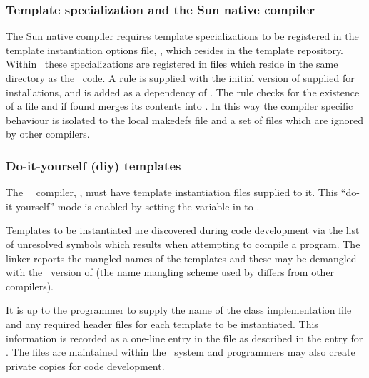 \subsubsection*{Template specialization and the Sun native compiler}

The Sun native compiler requires template specializations to be registered in
the template instantiation options file, , which resides in
the template repository.  Within \aipspp\ these specializations are registered
in  files which reside in the same directory as the
\cplusplus\ code.  A  rule is supplied with the initial
version of  supplied for  installations, and
 is added as a dependency of .  The
 rule checks for the existence of a 
file and if found merges its contents into .  In this way
the compiler specific behaviour is isolated to the local makedefs file and a
set of  files which are ignored by other compilers.

\subsubsection*{Do-it-yourself (diy) templates}

The \gnu\ \cplusplus\ compiler, , must have template
instantiation files supplied to it.  This ``do-it-yourself'' mode is enabled
by setting the  variable in  to .

Templates to be instantiated are discovered during code development via the
list of unresolved symbols which results when attempting to compile a program.
The linker reports the mangled names of the templates and these may be
demangled with the \gnu\ version of  (the name mangling
scheme used by  differs from other compilers).

It is up to the programmer to supply the name of the class implementation file
and any required header files for each template to be instantiated.  This
information is recorded as a one-line entry in the  file as
described in the entry for .  The  files are
maintained within the \aipspp\ system and programmers may also create private
copies for code development.

